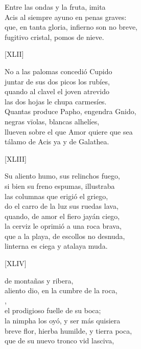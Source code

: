 \documentclass[11pt,a4paper,twoside]{article}
\begin{document}
Entre las ondas y la fruta, imita\\
Acis al siempre ayuno en penas graves:\\
que, en tanta gloria, infierno son no breve,\\
fugitivo cristal, pomos de nieve.\par\pend
%
\begin{center}
	[XLII]
\end{center}\pstart
No a las palomas concedió Cupido\\
juntar de sus dos picos los rubíes,\\
quando al clavel el joven atrevido\\
las dos hojas le chupa carmesíes.\\
Quantas produce Papho, engendra Gnido,\\
negras vïolas, blancas alhelíes,\\
llueven sobre el que Amor quiere que sea\\
tálamo de Acis ya y de Galathea.\par\pend
%
\begin{center}
	[XLIII]
\end{center}\pstart
Su aliento humo, sus relinchos fuego,\\
si bien su freno espumas, illustraba\\
las columnas  que erigió el griego,\\
do el carro de la luz sus ruedas lava,\\ quando, de amor el fiero jayán ciego,\\
la cerviz le oprimió a una roca brava,\\
que a la playa, de escollos no desnuda,\\
linterna es ciega y atalaya muda.\par\pend
%
\begin{center}
	[XLIV]
\end{center}\pstart
{} de montañas y ribera,\\
aliento dio, en la cumbre de la roca,\\
,\\
el prodigioso fuelle de su boca;\\
la nimpha los oyó, y ser más quisiera\\
breve flor, hierba humilde, y tierra poca,\\
que de su nuevo tronco vid lasciva,\\
\end{document}
